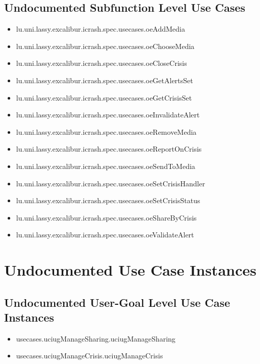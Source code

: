 \subsection[Undocumented Use Cases - Subfunction Level]{Undocumented Subfunction Level Use Cases}
\begin{itemize}
\item lu.uni.lassy.excalibur.icrash.spec.usecases.oeAddMedia 
\item lu.uni.lassy.excalibur.icrash.spec.usecases.oeChooseMedia 
\item lu.uni.lassy.excalibur.icrash.spec.usecases.oeCloseCrisis 
\item lu.uni.lassy.excalibur.icrash.spec.usecases.oeGetAlertsSet 
\item lu.uni.lassy.excalibur.icrash.spec.usecases.oeGetCrisisSet 
\item lu.uni.lassy.excalibur.icrash.spec.usecases.oeInvalidateAlert 
\item lu.uni.lassy.excalibur.icrash.spec.usecases.oeRemoveMedia 
\item lu.uni.lassy.excalibur.icrash.spec.usecases.oeReportOnCrisis 
\item lu.uni.lassy.excalibur.icrash.spec.usecases.oeSendToMedia 
\item lu.uni.lassy.excalibur.icrash.spec.usecases.oeSetCrisisHandler 
\item lu.uni.lassy.excalibur.icrash.spec.usecases.oeSetCrisisStatus 
\item lu.uni.lassy.excalibur.icrash.spec.usecases.oeShareByCrisis 
\item lu.uni.lassy.excalibur.icrash.spec.usecases.oeValidateAlert 
\end{itemize}





\section[Undocumented Use Case Instances]{Undocumented Use Case Instances}


\subsection[Undocumented Use Case Instances - User-Goal Level]{Undocumented User-Goal Level Use Case Instances}
\begin{itemize}
\item usecases.uciugManageSharing.uciugManageSharing 
\item usecases.uciugManageCrisis.uciugManageCrisis 
\end{itemize}




